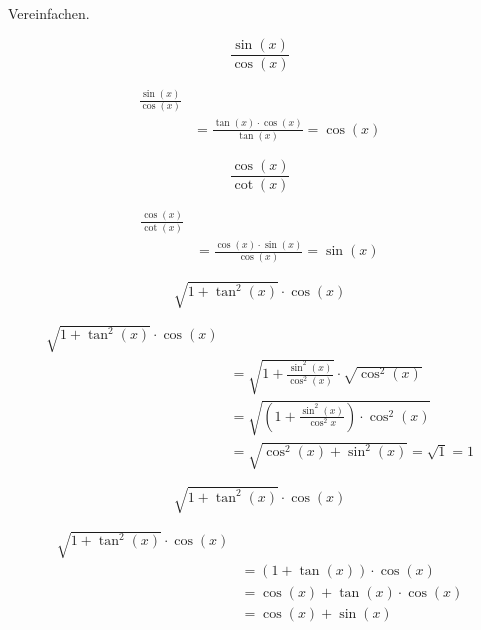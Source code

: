 \begin{uebung}
	Vereinfachen.

	\begin{question}
		\[
			\frac{\sin(x)}{\cos(x)}
		\]
	\end{question}

	\begin{solution}
		\begin{align*}
			\frac{\sin(x)}{\cos(x)}                              \\
			 & = \frac{\tan(x) \cdot \cos(x)}{\tan(x)} = \cos(x)
		\end{align*}
	\end{solution}

	\begin{question}
		\[
			\frac{\cos(x)}{\cot(x)}
		\]
	\end{question}

	\begin{solution}
		\begin{align*}
			\frac{\cos(x)}{\cot(x)}                              \\
		 	& = \frac{\cos(x) \cdot \sin(x)}{\cos(x)} = \sin(x)
		\end{align*}
	\end{solution}

	\begin{question}
		\[
			\sqrt{1+ \tan^2(x)} \cdot \cos(x)
		\]
	\end{question}

	\begin{solution}
		\begin{align*}
			\sqrt{1+ \tan^2(x)} \cdot \cos(x)                                         \\
			 & = \sqrt{1 + \frac{\sin^2(x)}{\cos^2(x)}} \cdot \sqrt{\cos^2(x)}        \\
			 & = \sqrt{\left(1 + \frac{\sin^2(x)}{\cos^2{x}} \right) \cdot \cos^2(x)} \\
			 & = \sqrt{\cos^2(x) + \sin^2(x)} = \sqrt{1} = 1
		\end{align*}
	\end{solution}

	\begin{question}
		\[
			\sqrt{1 + \tan^2(x)} \cdot \cos(x)
		\]
	\end{question}

	\begin{solution}
		\begin{align*}
			\sqrt{1 + \tan^2(x)} \cdot \cos(x)   \\
			 & = (1 + \tan(x)) \cdot \cos(x)     \\
			 & = \cos(x) + \tan(x) \cdot \cos(x) \\
			 & = \cos(x) + \sin(x)
		\end{align*}
	\end{solution}
\end{uebung}
